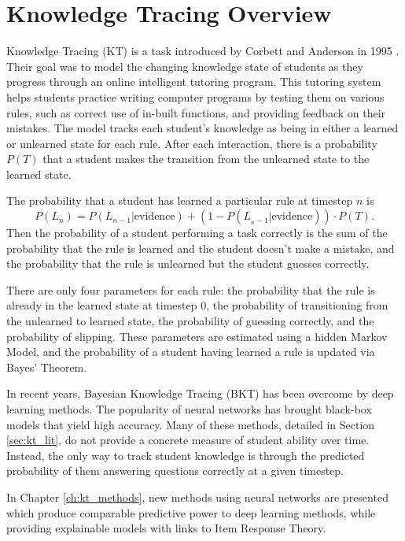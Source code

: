 \chapter{Knowledge Tracing Overview}

Knowledge Tracing (KT) is a task introduced by Corbett and Anderson in 1995 \cite{corbett1995}. Their goal was to model the changing knowledge state of students as they progress through an online intelligent tutoring program. This tutoring system helps students practice writing computer programs by testing them on various rules, such as correct use of in-built functions, and providing feedback on their mistakes. The model tracks each student's knowledge as being in either a learned or unlearned state for each rule. After each interaction, there is a probability $P(T)$ that a student makes the transition from the unlearned state to the learned state.

The probability that a student has learned a particular rule at timestep $n$ is
\begin{equation}
P(L_n) = P(L_{n-1} | \text{evidence}) + (1 - P(L_{_n-1} | \text{evidence})) \cdot P(T).
\label{eq:kt}
\end{equation}
Then the probability of a student performing a task correctly is the sum of the probability that the rule is learned and the student doesn't make a mistake, and the probability that the rule is unlearned but the student guesses correctly.

There are only four parameters for each rule: the probability that the rule is already in the learned state at timestep 0, the probability of transitioning from the unlearned to learned state, the probability of guessing correctly, and the probability of slipping. These parameters are estimated using a hidden Markov Model, and the probability of a student having learned a rule is updated via Bayes' Theorem.

In recent years, Bayesian Knowledge Tracing (BKT) has been overcome by deep learning methods. The popularity of neural networks has brought black-box models that yield high accuracy. Many of these methods, detailed in Section \ref{sec:kt_lit}, do not provide a concrete measure of student ability over time. Instead, the only way to track student knowledge is through the predicted probability of them answering questions correctly at a given timestep. 

In Chapter \ref{ch:kt_methods}, new methods using neural networks are presented which produce comparable predictive power to deep learning methods, while providing explainable models with links to Item Response Theory.


